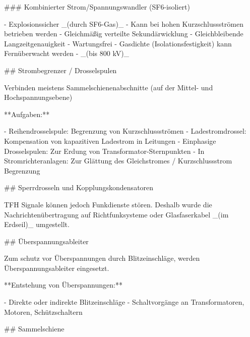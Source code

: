 \begin{markdown}
\newpage

### Kombinierter Strom/Spannungswandler (SF6-isoliert)

- Explosionssicher _(durch SF6-Gas)_
- Kann bei hohen Kurzschlussströmen betrieben werden
- Gleichmäßig verteilte Sekundärwicklung
- Gleichbleibende Langzeitgenauigkeit
- Wartungsfrei
- Gasdichte (Isolationsfestigkeit) kann Fernüberwacht werden
- _(bis 800 kV)_

## Strombegrenzer / Drosselspulen


Verbinden meistens Sammelschienenabschnitte (auf der Mittel- und Hochspannungsebene)

**Aufgaben:**

- Reihendrosselspule: Begrenzung von Kurzschlussströmen
- Ladestromdrossel: Kompensation von kapazitiven Ladestrom in Leitungen
- Einphasige Drosselspulen: Zur Erdung von Transformator-Sternpunkten
- In Stromrichteranlagen: Zur Glättung des Gleichstromes / Kurzschlussstrom Begrenzung


## Sperrdrosseln und Kopplungskondensatoren


TFH Signale können jedoch Funkdienste stören. Deshalb wurde die Nachrichtenübertragung auf Richtfunksysteme oder Glasfaserkabel _(im Erdseil)_ umgestellt.

## Überspannungsableiter

Zum schutz vor Überspannungen durch Blitzeinschläge, werden Überspannungsableiter eingesetzt.


**Entstehung von Überspannungen:**

- Direkte oder indirekte Blitzeinschläge
- Schaltvorgänge an Transformatoren, Motoren, Schützschaltern

## Sammelschiene



\end{markdown}
